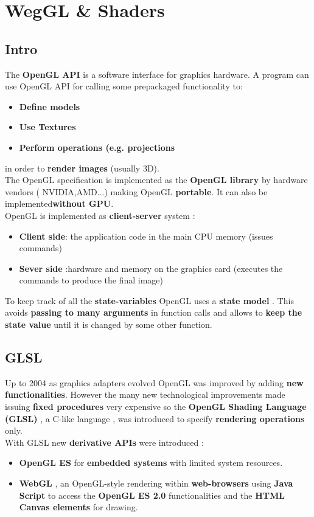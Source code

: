 \newpage
\section{WegGL \& Shaders}
\subsection{Intro}
The \textbf{OpenGL API} is a software interface for graphics hardware. A program can use OpenGL API for calling some prepackaged functionality to:
\begin{itemize}
\item \textbf{Define models}
\item \textbf{Use Textures}
\item \textbf{Perform operations (e.g. projections}
\end{itemize}
in order to \textbf{render images} (usually 3D).\\
The OpenGL specification is implemented as the \textbf{OpenGL library} by hardware vendors ( NVIDIA,AMD...) making OpenGL \textbf{portable}. It can also be implemented\textbf{without GPU}.
\\OpenGL is implemented as \textbf{client-server} system : 
\begin{itemize}
\item \textbf{Client side}: the application code in the main CPU memory  (issues commands) 
\item \textbf{Sever side} :hardware and memory on the graphics card (executes the commands to produce the final image)
\end{itemize}
To keep track of all the \textbf{state-variables} OpenGL uses a \textbf{state model} . This avoids \textbf{passing to many arguments} in function calls and allows to \textbf{keep the state value} until it is changed by some other function.\\
\subsection{GLSL}
Up to 2004 as graphics adapters evolved OpenGL was improved by adding \textbf{new functionalities}. However the many new technological improvements made issuing \textbf{fixed procedures} very expensive so the \textbf{OpenGL Shading Language (GLSL)} , a C-like language , was introduced to specify \textbf{rendering operations} only.\\
With GLSL new \textbf{derivative APIs} were introduced : 
\begin{itemize}
\item \textbf{OpenGL ES} for \textbf{embedded systems} with limited system resources.
\item \textbf{WebGL} , an OpenGL-style rendering within \textbf{web-browsers} using \textbf{Java Script} to access the\textbf{ OpenGL ES 2.0} functionalities and the \textbf{HTML Canvas elements} for drawing.
\end{itemize}


